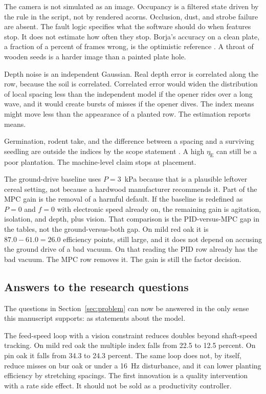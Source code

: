 The camera is not simulated as an image. Occupancy is a filtered state driven by the rule in the script, not by rendered acorns. Occlusion, dust, and strobe failure are absent. The fault logic specifies what the software should do when features stop. It does not estimate how often they stop. Borja's accuracy on a clean plate, a fraction of a percent of frames wrong, is the optimistic reference \cite{borja2021}. A throat of wooden seeds is a harder image than a painted plate hole.

Depth noise is an independent Gaussian. Real depth error is correlated along the row, because the soil is correlated. Correlated error would widen the distribution of local spacing less than the independent model if the opener rides over a long wave, and it would create bursts of misses if the opener dives. The index means might move less than the appearance of a planted row. The estimation reports means.

Germination, rodent take, and the difference between a spacing and a surviving seedling are outside the indices by the scope statement \cite{lof2019,grossnickle2012}. A high $\eta_{\mathrm{E}}$ can still be a poor plantation. The machine-level claim stops at placement.

The ground-drive baseline uses $P=3$~kPa because that is a plausible leftover cereal setting, not because a hardwood manufacturer recommends it. Part of the MPC gain is the removal of a harmful default. If the baseline is redefined as $P=0$ and $f=0$ with electronic speed already on, the remaining gain is agitation, isolation, and depth, plus vision. That comparison is the PID-versus-MPC gap in the tables, not the ground-versus-both gap. On mild red oak it is $87.0-61.0=26.0$ efficiency points, still large, and it does not depend on accusing the ground drive of a bad vacuum. On that reading the PID row already has the bad vacuum. The MPC row removes it. The gain is still the factor decision.

\subsection{Answers to the research questions}

The questions in Section~\ref{sec:problem} can now be answered in the only sense this manuscript supports: as statements about the model.

The feed-speed loop with a vision constraint reduces doubles beyond shaft-speed tracking. On mild red oak the multiple index falls from 22.5 to 12.5 percent. On pin oak it falls from 34.3 to 24.3 percent. The same loop does not, by itself, reduce misses on bur oak or under a 16~Hz disturbance, and it can lower planting efficiency by stretching spacings. The first innovation is a quality intervention with a rate side effect. It should not be sold as a productivity controller.

